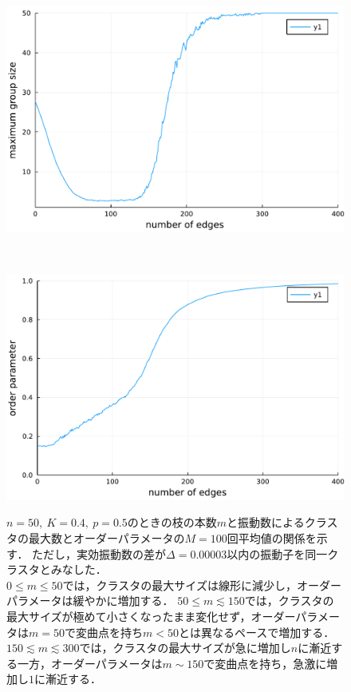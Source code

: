 \documentclass[../main]{subfiles}
\begin{document}
\begin{figure}[tbp]
    \begin{minipage}[b]{\linewidth}
      \centering
      \includegraphics[keepaspectratio, scale=0.5]{images/edge-finite-maxsize-delta00003400.pdf}
      \label{fig:edge-cutting-K04-maxsize}
    \end{minipage}\\
    \begin{minipage}[b]{\linewidth}
      \centering
      \includegraphics[keepaspectratio, scale=0.5]{images/edge-finite-R-delta00003400.pdf}
      \label{fig:edge-cutting-K04-R}
    \end{minipage}
    \caption{$n=50,\ K=0.4,\ p=0.5$のときの枝の本数$m$と振動数によるクラスタの最大数とオーダーパラメータの$M=100$回平均値の関係を示す．
    ただし，実効振動数の差が$\Delta=0.00003$以内の振動子を同一クラスタとみなした．\\
    $0\leq m\leq 50$では，クラスタの最大サイズは線形に減少し，オーダーパラメータは緩やかに増加する．
    $50\leq m\lesssim 150$では，クラスタの最大サイズが極めて小さくなったまま変化せず，オーダーパラメータは$m=50$で変曲点を持ち$m<50$とは異なるペースで増加する．
    $150\lesssim m\lesssim 300$では，クラスタの最大サイズが急に増加し$n$に漸近する一方，オーダーパラメータは$m\sim 150$で変曲点を持ち，急激に増加し$1$に漸近する．
    }
    \label{fig:edge-cutting-K04}
\end{figure}
\end{document}
